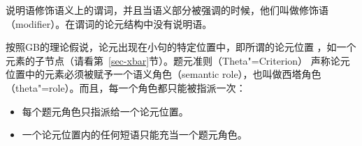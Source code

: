 
说明语修饰语义上的谓词，并且当语义部分被强调的时候，他们叫做修饰语（modifier）。在谓词的论元结构中没有说明语。

按照GB的理论假说，论元出现在小句的特定位置中，即所谓的论元位置 ，如一个\xnull 元素的子节点（请看第~\ref{sec-xbar}节）。题元准则（Theta"=Criterion） 声称论元位置中的元素必须被赋予一个语义角色（semantic role），也叫做西塔角色（theta"=role）。而且，每一个角色都只能被指派一次\citep[]{Chomsky81a}：
\begin{principle-break}[题元准则]\label{theta-Kriterium}
\begin{itemize}
\item 每个题元角色只指派给一个论元位置。
\item 一个论元位置内的任何短语只能充当一个题元角色。
\end{itemize}
\end{principle-break}
\noindent
%

